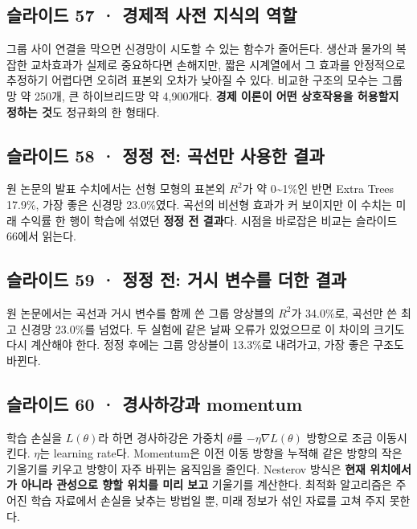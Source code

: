 \documentclass[11pt,a4paper]{article}
\begin{document}
\subsection{슬라이드 57 · 경제적 사전 지식의 역할}
그룹 사이 연결을 막으면 신경망이 시도할 수 있는 함수가 줄어든다. 생산과 물가의 복잡한 교차효과가 실제로 중요하다면 손해지만, 짧은 시계열에서 그 효과를 안정적으로 추정하기 어렵다면 오히려 표본외 오차가 낮아질 수 있다. 비교한 구조의 모수는 그룹망 약 250개, 큰 하이브리드망 약 4,900개다. \textbf{경제 이론이 어떤 상호작용을 허용할지 정하는 것}도 정규화의 한 형태다.\par

\subsection{슬라이드 58 · 정정 전: 곡선만 사용한 결과}
원 논문의 발표 수치에서는 선형 모형의 표본외 $R^2$가 약 0\~{}1\%인 반면 Extra Trees 17.9\%, 가장 좋은 신경망 23.0\%였다. 곡선의 비선형 효과가 커 보이지만 이 수치는 미래 수익률 한 행이 학습에 섞였던 \textbf{정정 전 결과}다. 시점을 바로잡은 비교는 슬라이드 66에서 읽는다.\par

\subsection{슬라이드 59 · 정정 전: 거시 변수를 더한 결과}
원 논문에서는 곡선과 거시 변수를 함께 쓴 그룹 앙상블의 $R^2$가 34.0\%로, 곡선만 쓴 최고 신경망 23.0\%를 넘었다. 두 실험에 같은 날짜 오류가 있었으므로 이 차이의 크기도 다시 계산해야 한다. 정정 후에는 그룹 앙상블이 13.3\%로 내려가고, 가장 좋은 구조도 바뀐다.\par

\subsection{슬라이드 60 · 경사하강과 momentum}
학습 손실을 $L(\theta)$라 하면 경사하강은 가중치 $\theta$를 $-\eta\nabla L(\theta)$ 방향으로 조금 이동시킨다. $\eta$는 learning rate다. Momentum은 이전 이동 방향을 누적해 같은 방향의 작은 기울기를 키우고 방향이 자주 바뀌는 움직임을 줄인다. Nesterov 방식은 \textbf{현재 위치에서가 아니라 관성으로 향할 위치를 미리 보고} 기울기를 계산한다. 최적화 알고리즘은 주어진 학습 자료에서 손실을 낮추는 방법일 뿐, 미래 정보가 섞인 자료를 고쳐 주지 못한다.\par
\end{document}
